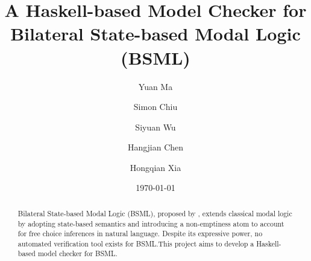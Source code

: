 \documentclass[12pt,a4paper]{article}
\title{A Haskell-based Model Checker for Bilateral State-based Modal Logic (BSML)}
\author{Yuan Ma \and Simon Chiu \and Siyuan Wu \and Hangjian Chen \and Hongqian Xia}
\date{\today}
\begin{document}
\maketitle

\begin{abstract}

    Bilateral State-based Modal Logic (BSML), proposed by \citet{Aloni2024}, extends classical modal logic by adopting state-based semantics and introducing a non-emptiness atom to account for free choice inferences in natural language. Despite its expressive power, no automated verification tool exists for BSML.\@ This project aims to develop a Haskell-based model checker for BSML.\@ 

\end{abstract}


\tableofcontents

\clearpage





















\end{document}
